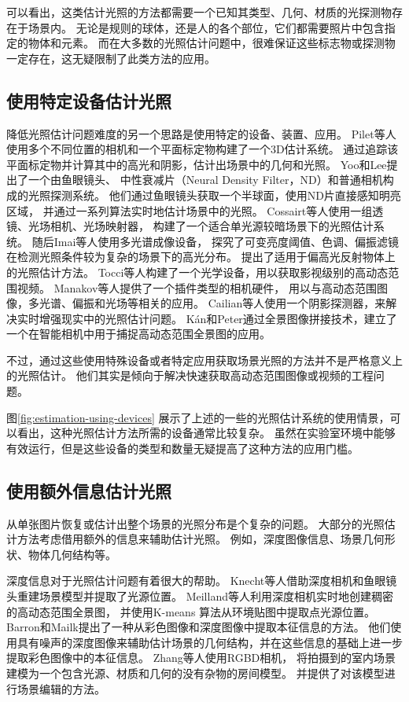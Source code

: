可以看出，这类估计光照的方法都需要一个已知其类型、几何、材质的光探测物存在于场景内。
无论是规则的球体，还是人的各个部位，它们都需要照片中包含指定的物体和元素。
而在大多数的光照估计问题中，很难保证这些标志物或探测物一定存在，这无疑限制了此类方法的应用。

\subsection{使用特定设备估计光照}
降低光照估计问题难度的另一个思路是使用特定的设备、装置、应用。
Pilet等人\cite{pilet2006all}使用多个不同位置的相机和一个平面标定物构建了一个3D估计系统。
通过追踪该平面标定物并计算其中的高光和阴影，估计出场景中的几何和光照。
Yoo和Lee\cite{yoo2008real}提出了一个由鱼眼镜头、
中性衰减片（Neural Density Filter，ND）和普通相机构成的光照探测系统。
他们通过鱼眼镜头获取一个半球面，使用ND片直接感知明亮区域，
并通过一系列算法实时地估计场景中的光照。
Cossairt\cite{cossairt2008light}等人使用一组透镜、光场相机、光场映射器，
构建了一个适合单光源较暗场景下的光照估计系统。
随后Imai等人\cite{imai2011estimation}使用多光谱成像设备，
探究了可变亮度阈值、色调、偏振滤镜在检测光照条件较为复杂的场景下的高光分布。
提出了适用于偏高光反射物体上的光照估计方法。
Tocci等人\cite{tocci2011versatile}构建了一个光学设备，用以获取影视级别的高动态范围视频。
Manakov等人\cite{manakov2013reconfigurable}提供了一个插件类型的相机硬件，
用以与高动态范围图像，多光谱、偏振和光场等相关的应用。
Cailian等人\cite{calian2013shading}使用一个阴影探测器，来解决实时增强现实中的光照估计问题。
K\'an和Peter\cite{kan2015interactive}通过全景图像拼接技术，建立了一个在智能相机中用于捕捉高动态范围全景图的应用。

不过，通过这些使用特殊设备或者特定应用获取场景光照的方法并不是严格意义上的光照估计。
他们其实是倾向于解决快速获取高动态范围图像或视频的工程问题。

图\ref{fig:estimation-using-devices}
展示了上述的一些的光照估计系统的使用情景，可以看出，这种光照估计方法所需的设备通常比较复杂。
虽然在实验室环境中能够有效运行，但是这些设备的类型和数量无疑提高了这种方法的应用门槛。

\subsection{使用额外信息估计光照}
从单张图片恢复或估计出整个场景的光照分布是个复杂的问题。
大部分的光照估计方法考虑借用额外的信息来辅助估计光照。
例如，深度图像信息、场景几何形状、物体几何结构等。

深度信息对于光照估计问题有着很大的帮助。
Knecht等人\cite{knecht2012reciprocal}借助深度相机和鱼眼镜头重建场景模型并提取了光源位置。
Meilland等人\cite{meilland20133d}利用深度相机实时地创建稠密的高动态范围全景图，
并使用K-means 算法从环境贴图中提取点光源位置。 
Barron和Mailk\cite{barron2013intrinsic}提出了一种从彩色图像和深度图像中提取本征信息的方法。
他们使用具有噪声的深度图像来辅助估计场景的几何结构，并在这些信息的基础上进一步提取彩色图像中的本征信息。
Zhang等人\cite{zhang2016emptying}使用RGBD相机，
将拍摄到的室内场景建模为一个包含光源、材质和几何的没有杂物的房间模型。
并提供了对该模型进行场景编辑的方法。

